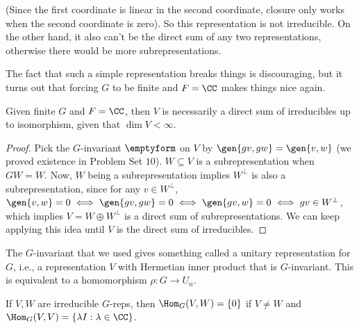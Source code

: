 (Since the first coordinate is linear in the second coordinate, closure only works when the second coordinate is zero). So this representation is not irreducible. On the other hand, it also can't be the direct sum of any two representations, otherwise there would be more subrepresentations. 

The fact that such a simple representation breaks things is discouraging, but it turns out that forcing $G$ to be finite and $F=\CC$ makes things nice again.

\begin{theorem}
\proplabel

Given finite $G$ and $F=\CC$, then $V$ is necessarily a direct sum of irreducibles up to isomorphism, given that $\dim V < \infty$.
\end{theorem}

\begin{proof}
Pick the $G$-invariant $\emptyform$ on $V$ by $\gen{gv, gw} = \gen{v,w}$ (we proved existence in Problem Set $10$). $W\subseteq V$ is a subrepresentation when $GW=W$. Now, $W$ being a subrepresentation implies $W^{\perp}$ is also a subrepresentation, since for any $v\in W^{\perp}$, $\gen{v,w} = 0\iff \gen{gv,gw}=0 \iff \gen{gv,w} = 0 \iff gv\in W^{\perp}$, which implies $V = W\oplus W^{\perp}$ is a direct sum of subrepresentations. We can keep applying this idea until $V$ is the direct sum of irreducibles. 
\end{proof}

The $G$-invariant that we used gives something called a \ac{unitary representation} for $G$, i.e., a representation $V$ with Hermetian inner product that is $G$-invariant. This is equivalent to a homomorphism $\rho : G\rightarrow U_n$. 

\begin{theorem}

If $V,W$ are irreducible $G$-reps, then $\Hom_G(V,W) = \{0\}$ if $V\neq W$ and $\Hom_G(V,V) = \{\lambda I : \lambda \in \CC\}$. 
\end{theorem}